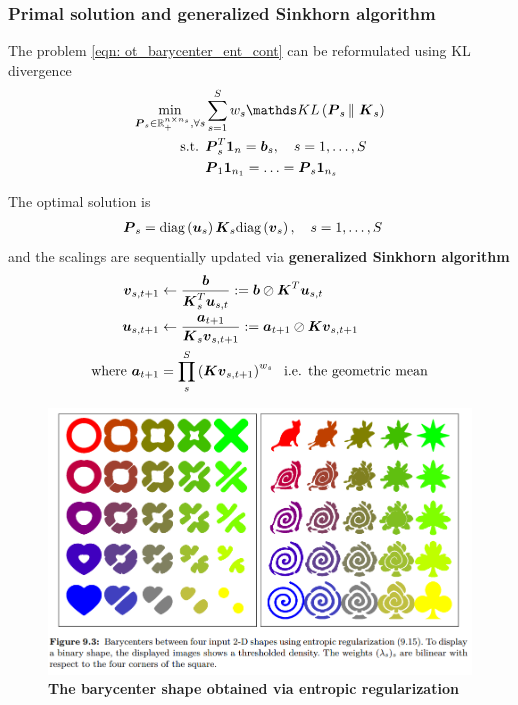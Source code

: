 \documentclass[11pt]{article}
\begin{document}
\subsubsection{Primal solution and generalized Sinkhorn algorithm}
The problem \eqref{eqn: ot_barycenter_ent_cont} can be reformulated using KL divergence
\begin{align}
 \min_{\mb{P}_s \in \bR_{+}^{n \times n_s}, \forall s}& \sum_{s=1}^{S}w_{s}\kl{\mb{P}_s}{\mb{K}_s}  \label{eqn: ot_barycenter_kl}\\
 \text{s.t. } &\mb{P}_s^{T}\mb{1}_{n} = \mb{b}_s, \quad s=1,\ldots, S\nonumber \\
 & \mb{P}_1\mb{1}_{n_1} = \ldots = \mb{P}_s\mb{1}_{n_s}\nonumber
\end{align}

The optimal solution is
\begin{align}
\boldsymbol{P}_s &=  \text{diag}\left(\boldsymbol{u}_s\right)\boldsymbol{K}_{s}\text{diag}\left(\boldsymbol{v}_s\right), \quad s=1,\ldots, S  \label{eqn: ot_barycenter_kl_sol}
\end{align}
and the scalings are sequentially updated via \textbf{generalized Sinkhorn algorithm}
\begin{align}
\boldsymbol{v}_{s, t+1} &\leftarrow \frac{\boldsymbol{b}}{\boldsymbol{K}_{s}^{T}\boldsymbol{u}_{s, t}} :=\boldsymbol{b}\oslash \boldsymbol{K}^{T}\boldsymbol{u}_{s, t}   \label{eqn: ot_barycenter_sinkhorn_v}\\
\boldsymbol{u}_{s, t+1} &\leftarrow \frac{\boldsymbol{a}_{t+1}}{\boldsymbol{K}_{s}\boldsymbol{v}_{s, t+1}} := \boldsymbol{a}_{t+1}\oslash \boldsymbol{K}\boldsymbol{v}_{s, t+1} \label{eqn: ot_barycenter_sinkhorn_u} \\
\text{where } \boldsymbol{a}_{t+1}&= \prod_{s}^{S}\left(\boldsymbol{K}\boldsymbol{v}_{s, t+1}\right)^{w_s} \; \text{ i.e. the geometric mean} \nonumber
\end{align}

\begin{figure}
\begin{minipage}[t]{1\linewidth}
  \centering
  \centerline{\includegraphics[scale = 0.4]{barycenter_ent_reg.png}}
\end{minipage}
\caption{\footnotesize{\textbf{The barycenter shape obtained via entropic regularization \citep{gabriel2019computational} }}}
\label{fig: barycenter_ent_reg}
\end{figure}
\end{document}
